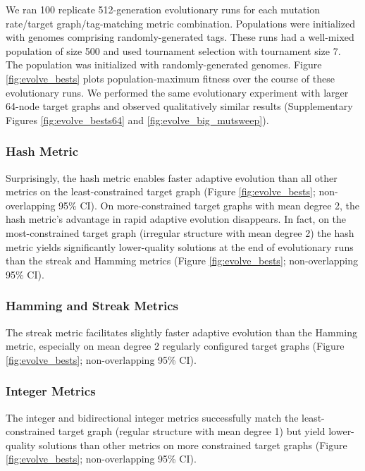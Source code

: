 We ran 100 replicate 512-generation evolutionary runs for each mutation rate/target graph/tag-matching metric combination.
Populations were initialized with genomes comprising randomly-generated tags.
These runs had a well-mixed population of size 500 and used tournament selection with tournament size 7.
The population was initialized with randomly-generated genomes.
Figure \ref{fig:evolve_bests} plots population-maximum fitness over the course of these evolutionary runs.
We performed the same evolutionary experiment with larger 64-node target graphs and observed qualitatively similar results (Supplementary Figures \ref{fig:evolve_bests64} and \ref{fig:evolve_big_mutsweep}).

\subsubsection{Hash Metric}

Surprisingly, the hash metric enables faster adaptive evolution than all other metrics on the least-constrained target graph (Figure \ref{fig:evolve_bests}; non-overlapping 95\% CI).
On more-constrained target graphs with mean degree 2, the hash metric's advantage in rapid adaptive evolution disappears.
In fact, on the most-constrained target graph (irregular structure with mean degree 2) the hash metric yields significantly lower-quality solutions at the end of evolutionary runs than the streak and Hamming metrics (Figure \ref{fig:evolve_bests}; non-overlapping 95\% CI).

\subsubsection{Hamming and Streak Metrics}

The streak metric facilitates slightly faster adaptive evolution than the Hamming metric, especially on mean degree 2 regularly configured target graphs (Figure \ref{fig:evolve_bests}; non-overlapping 95\% CI).

\subsubsection{Integer Metrics}

The integer and bidirectional integer metrics successfully match the least-constrained target graph (regular structure with mean degree 1) but yield lower-quality solutions than other metrics on more constrained target graphs (Figure \ref{fig:evolve_bests}; non-overlapping 95\% CI).

